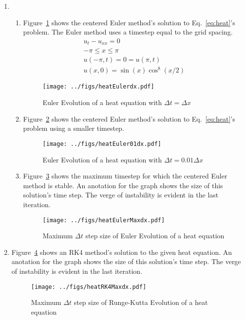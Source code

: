 \documentclass[12pt,a4]{article}
\begin{document}
\begin{enumerate}
  \item
    \begin{enumerate}
      \item
        Figure~\ref{fig:heatEulerdx} shows the centered Euler method's solution to Eq.~\ref{eq:heat}'s problem.
        The Euler method uses a timestep equal to the grid spacing.
        \begin{equation}
          \begin{gathered}
            u_t - u_{xx} = 0\\
            - \pi \leq x \leq \pi\\
            u(-\pi, t) = 0 = u(\pi, t)\\
            u(x, 0) = \sin(x) \cos^8(x / 2)
          \end{gathered}
          \label{eq:heat}
        \end{equation}

        \begin{figure}[H]
          \centering
          \texttt{[image: ../figs/heatEulerdx.pdf]}
          \caption{Euler Evolution of a heat equation with $\Delta t = \Delta x$}
          \label{fig:heatEulerdx}
        \end{figure}

      \item
        Figure~\ref{fig:heatEuler01dx} shows the centered Euler method's solution to Eq.~\ref{eq:heat}'s problem using a smaller timestep.
        \begin{figure}[H]
          \centering
          \texttt{[image: ../figs/heatEuler01dx.pdf]}
          \caption{Euler Evolution of a heat equation with $\Delta t = 0.01 \Delta x$}
          \label{fig:heatEuler01dx}
        \end{figure}

      \item
        Figure~\ref{fig:heatEulerMaxdx} shows the maximum timestep for which the centered Euler method is stable.
        An anotation for the graph shows the size of this solution's time step.
        The verge of instability is evident in the last iteration.
        \begin{figure}[H]
          \centering
          \texttt{[image: ../figs/heatEulerMaxdx.pdf]}
          \caption{Maximum $\Delta t$ step size of Euler Evolution of a heat equation}
          \label{fig:heatEulerMaxdx}
        \end{figure}

    \end{enumerate}
  \item
    Figure~\ref{fig:heatRK4Maxdx} shows an RK4 method's solution to the given heat equation.
    An anotation for the graph shows the size of this solution's time step.
    The verge of instability is evident in the last iteration.
    \begin{figure}[H]
      \centering
      \texttt{[image: ../figs/heatRK4Maxdx.pdf]}
      \caption{Maximum $\Delta t$ step size of Runge-Kutta Evolution of a heat equation}
      \label{fig:heatRK4Maxdx}
    \end{figure}
\end{enumerate}
\end{document}
